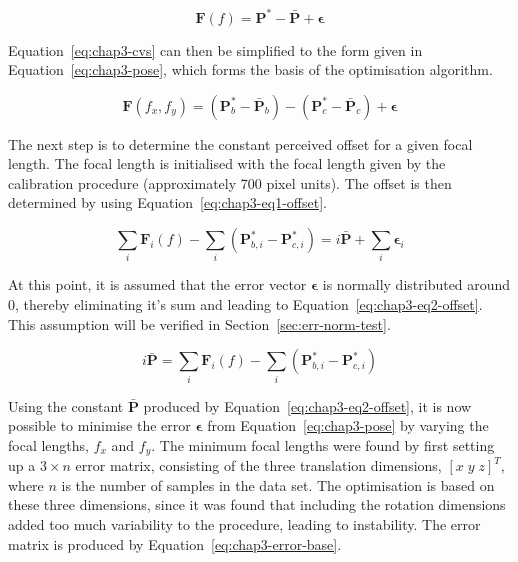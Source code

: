 \begin{equation}
  \label{eq:chap3-cvs}
  \bm{F}(f) = \bm{P}^* - \bar{\bm{P}} + \bm{\epsilon}
\end{equation}

Equation~\ref{eq:chap3-cvs} can then be simplified to the form given in Equation~\ref{eq:chap3-pose}, which forms the basis of the optimisation algorithm. 

\begin{equation}
  \label{eq:chap3-pose}
  \bm{F}(f_x, f_y) = (\bm{P}^*_b - \bar{\bm{P}}_b) - (\bm{P}^*_c - \bar{\bm{P}}_c) + \bm{\epsilon}
\end{equation}

The next step is to determine the constant perceived offset for a given focal length. The focal length is initialised with the focal length given by the calibration procedure (approximately 700 pixel units). The offset is then determined by using Equation~\ref{eq:chap3-eq1-offset}.

\begin{equation}
  \label{eq:chap3-eq1-offset}
  \sum\limits_i \bm{F}_i(f) - \sum\limits_i(\bm{P}^*_{b,i} - \bm{P}^*_{c, i}) = i\bar{\bm{P}} + \sum\limits_i\bm{\epsilon}_i
\end{equation}

At this point, it is assumed that the error vector $\bm{\epsilon}$ is normally distributed around $0$, thereby eliminating it's sum and leading to Equation~\ref{eq:chap3-eq2-offset}. This assumption will be verified in Section~\ref{sec:err-norm-test}. 

\begin{equation}
  \label{eq:chap3-eq2-offset}
  i\bar{\bm{P}} = \sum\limits_i \bm{F}_i(f) - \sum\limits_i(\bm{P}^*_{b,i} - \bm{P}^*_{c, i})
\end{equation}

Using the constant $\bar{\bm{P}}$ produced by Equation~\ref{eq:chap3-eq2-offset}, it is now possible to minimise the error $\bm{\epsilon}$ from Equation~\ref{eq:chap3-pose} by varying the focal lengths, $f_x$ and $f_y$. The minimum focal lengths were found by first setting up a $3\times n$ error matrix, consisting of the three translation dimensions, ${[x\;y\;z]}^T$, where $n$ is the number of samples in the data set. The optimisation is based on these three dimensions, since it was found that including the rotation dimensions added too much variability to the procedure, leading to instability. The error matrix is produced by Equation~\ref{eq:chap3-error-base}.

